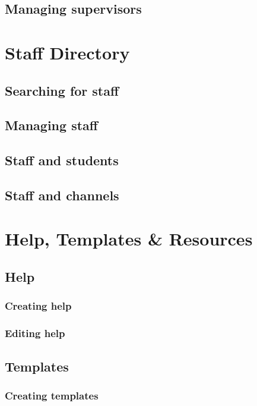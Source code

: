 \documentclass[12 pt]{book}
\begin{document}
\section{Managing supervisors}
%
%
%

\chapter{Staff Directory}

\section{Searching for staff}

\section{Managing staff}

\section{Staff and students}

\section{Staff and channels}

%
%
%

\chapter{Help, Templates \& Resources}

\section{Help}

\subsection{Creating help}

\subsection{Editing help}

\section{Templates}

\subsection{Creating templates}
\end{document}
